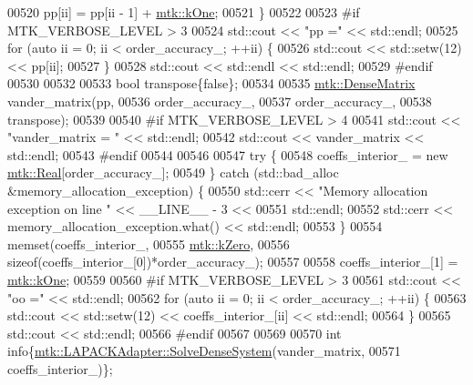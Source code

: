 \begin{DoxyCode}
{{00520     pp[ii] = pp[ii - 1] + \hyperlink{group__c01-roots_ga26407c24d43b6b95480943340d285c71}{mtk::kOne};
00521   \}
00522 
00523 \textcolor{preprocessor}{  #if MTK\_VERBOSE\_LEVEL > 3}
00524   std::cout << \textcolor{stringliteral}{"pp ="} << std::endl;
00525   \textcolor{keywordflow}{for} (\textcolor{keyword}{auto} ii = 0; ii < order\_accuracy\_; ++ii) \{
00526     std::cout << std::setw(12) << pp[ii];
00527   \}
00528   std::cout << std::endl << std::endl;
00529 \textcolor{preprocessor}{  #endif}
00530 
00532 
00533   \textcolor{keywordtype}{bool} transpose\{\textcolor{keyword}{false}\};
00534 
00535   \hyperlink{classmtk_1_1DenseMatrix}{mtk::DenseMatrix} vander\_matrix(pp,
00536                                  order\_accuracy\_,
00537                                  order\_accuracy\_,
00538                                  transpose);
00539 
00540 \textcolor{preprocessor}{  #if MTK\_VERBOSE\_LEVEL > 4}
00541   std::cout << \textcolor{stringliteral}{"vander\_matrix = "} << std::endl;
00542   std::cout << vander\_matrix << std::endl;
00543 \textcolor{preprocessor}{  #endif}
00544 
00546 
00547   \textcolor{keywordflow}{try} \{
00548     coeffs\_interior\_ = \textcolor{keyword}{new} \hyperlink{group__c01-roots_gac080bbbf5cbb5502c9f00405f894857d}{mtk::Real}[order\_accuracy\_];
00549   \} \textcolor{keywordflow}{catch} (std::bad\_alloc &memory\_allocation\_exception) \{
00550     std::cerr << \textcolor{stringliteral}{"Memory allocation exception on line "} << \_\_LINE\_\_ - 3 <<
00551       std::endl;
00552     std::cerr << memory\_allocation\_exception.what() << std::endl;
00553   \}
00554   memset(coeffs\_interior\_,
00555          \hyperlink{group__c01-roots_ga59a451a5fae30d59649bcda274fea271}{mtk::kZero},
00556          \textcolor{keyword}{sizeof}(coeffs\_interior\_[0])*order\_accuracy\_);
00557 
00558   coeffs\_interior\_[1] = \hyperlink{group__c01-roots_ga26407c24d43b6b95480943340d285c71}{mtk::kOne};
00559 
00560 \textcolor{preprocessor}{  #if MTK\_VERBOSE\_LEVEL > 3}
00561   std::cout << \textcolor{stringliteral}{"oo ="} << std::endl;
00562   \textcolor{keywordflow}{for} (\textcolor{keyword}{auto} ii = 0; ii < order\_accuracy\_; ++ii) \{
00563     std::cout << std::setw(12) << coeffs\_interior\_[ii] << std::endl;
00564   \}
00565   std::cout << std::endl;
00566 \textcolor{preprocessor}{  #endif}
00567 
00569 
00570   \textcolor{keywordtype}{int} info\{\hyperlink{classmtk_1_1LAPACKAdapter_a7428bccf74fd4a4af68fb7233846da22}{mtk::LAPACKAdapter::SolveDenseSystem}(vander\_matrix,
00571                                                 coeffs\_interior\_)\};
}}
\end{DoxyCode}
